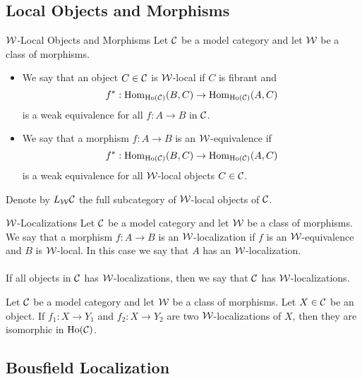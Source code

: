\documentclass[a4paper]{article}
\begin{document}
\subsection{Local Objects and Morphisms}
\begin{defn}{$\mathcal{W}$-Local Objects and Morphisms}{} Let $\mathcal{C}$ be a model category and let $\mathcal{W}$ be a class of morphisms. 
\begin{itemize}
\item We say that an object $C\in\mathcal{C}$ is $\mathcal{W}$-local if $C$ is fibrant and $$f^\ast:\operatorname{Hom}_{\text{Ho}(\mathcal{C})}(B,C)\to\operatorname{Hom}_{\text{Ho}(\mathcal{C})}(A,C)$$ is a weak equivalence for all $f:A\to B$ in $\mathcal{C}$. 
\item We say that a morphism $f:A\to B$ is an $\mathcal{W}$-equivalence if $$f^\ast:\operatorname{Hom}_{\text{Ho}(\mathcal{C})}(B,C)\to\operatorname{Hom}_{\text{Ho}(\mathcal{C})}(A,C)$$ is a weak equivalence for all $\mathcal{W}$-local objects $C\in\mathcal{C}$. 
\end{itemize}
Denote by $L_{\mathcal{W}}\mathcal{C}$ the full subcategory of $\mathcal{W}$-local objects of $\mathcal{C}$. 
\end{defn}

\begin{defn}{$\mathcal{W}$-Localizations}{} Let $\mathcal{C}$ be a model category and let $\mathcal{W}$ be a class of morphisms. We say that a morphism $f:A\to B$ is an $\mathcal{W}$-localization if $f$ is an $\mathcal{W}$-equivalence and $B$ is $\mathcal{W}$-local. In this case we say that $A$ has an $\mathcal{W}$-localization. \\~\\

If all objects in $\mathcal{C}$ has $\mathcal{W}$-localizations, then we say that $\mathcal{C}$ has $\mathcal{W}$-localizations. 
\end{defn}

\begin{prp}{}{} Let $\mathcal{C}$ be a model category and let $\mathcal{W}$ be a class of morphisms. Let $X\in\mathcal{C}$ be an object. If $f_1:X\to Y_1$ and $f_2:X\to Y_2$ are two $\mathcal{W}$-localizations of $X$, then they are isomorphic in $\text{Ho}(\mathcal{C})$. 
\end{prp}

\subsection{Bousfield Localization}
\end{document}

